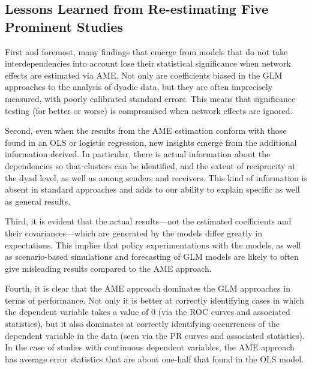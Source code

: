 \subsection{Lessons Learned from Re-estimating Five Prominent Studies}

First and foremost, many findings that emerge from models that do not take interdependencies into account lose their statistical significance when network effects are estimated via AME. Not only are coefficients biased in the GLM approaches to the analysis of dyadic data, but they are often imprecisely measured, with poorly calibrated standard errors.  This means that significance testing (for better or worse) is compromised when network effects are ignored.

Second, even when the results from the AME estimation conform with those found in an OLS or logistic regression, new insights emerge from the additional information derived. In particular, there is actual information about the dependencies so that clusters can be identified, and the extent of reciprocity at the dyad level, as well as among senders and receivers.  This kind of information is absent in standard approaches and adds to our ability to explain specific as well as general results.

Third, it is evident that the actual results---not the estimated coefficients and their covariances---which are generated by the models differ greatly in expectations.  This implies that policy experimentations with the models, as well as scenario-based simulations and forecasting of GLM models are likely to often give misleading results compared to the AME approach.

Fourth, it is clear that the AME approach dominates the GLM approaches in terms of performance. Not only it is better at correctly identifying cases in which the dependent variable takes a value of $0$ (via the ROC curves and associated statistics), but it also dominates at correctly identifying occurrences of the dependent variable in the data (seen via the PR curves and associated statistics).  In the case of studies with continuous dependent variables, the AME approach has average error statistics that are about one-half that found in the OLS model. 